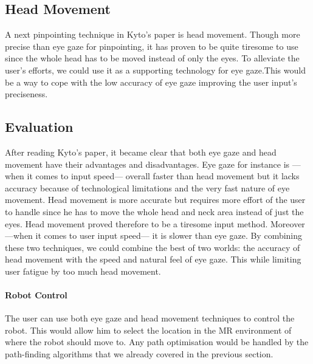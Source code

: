 \newpage
\subsection{Head Movement}
A next pinpointing technique in Kyto's paper\cite{kyto2018pinpointing} is head movement. Though more precise than eye gaze for pinpointing, it has proven to be quite tiresome to use since the whole head has to be moved instead of only the eyes. To alleviate the user's efforts, we could use it as a supporting technology for eye gaze.This would be a way to cope with the low accuracy of eye gaze improving the user input's preciseness.


\subsection{Evaluation}
After reading Kyto's paper\cite{kyto2018pinpointing}, it became clear that both eye gaze and head movement have their advantages and disadvantages. Eye gaze for instance is ---when it comes to input speed--- overall faster than head movement but it lacks accuracy because of technological limitations and the very fast nature of eye movement.\newline 
Head movement is more accurate but requires more effort of the user to handle since he has to move the whole head and neck area instead of just the eyes. Head movement proved therefore to be a tiresome input method. Moreover ---when it comes to user input speed--- it is slower than eye gaze.\newline 
By combining these two techniques, we could combine the best of two worlds: the accuracy of head movement with the speed and natural feel of eye gaze. This while limiting user fatigue by too much head movement.

\paragraph{Robot Control}
The user can use both eye gaze and head movement techniques to control the robot. This would allow him to select the location in the MR environment of where the robot should move to. Any path optimisation would be handled by the path-finding algorithms that we already covered in the previous section.

